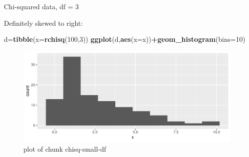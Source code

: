 \documentclass[
  ignorenonframetext,
]{beamer}
\newenvironment{Shaded}{\begin{snugshade}}{\end{snugshade}}
\newcommand{\DataTypeTok}[1]{\textcolor[rgb]{0.13,0.29,0.53}{#1}}
\newcommand{\DecValTok}[1]{\textcolor[rgb]{0.00,0.00,0.81}{#1}}
\newcommand{\KeywordTok}[1]{\textcolor[rgb]{0.13,0.29,0.53}{\textbf{#1}}}
\newcommand{\NormalTok}[1]{#1}
\newcommand{\OperatorTok}[1]{\textcolor[rgb]{0.81,0.36,0.00}{\textbf{#1}}}
\begin{document}
\begin{frame}[fragile]{Chi-squared data, df = 3}
\protect\hypertarget{chi-squared-data-df-3}{}

Definitely skewed to right:

\begin{Shaded}
\begin{Highlighting}[]
\NormalTok{d=}\KeywordTok{tibble}\NormalTok{(}\DataTypeTok{x=}\KeywordTok{rchisq}\NormalTok{(}\DecValTok{100}\NormalTok{,}\DecValTok{3}\NormalTok{))}
\KeywordTok{ggplot}\NormalTok{(d,}\KeywordTok{aes}\NormalTok{(}\DataTypeTok{x=}\NormalTok{x))}\OperatorTok{+}\KeywordTok{geom_histogram}\NormalTok{(}\DataTypeTok{bins=}\DecValTok{10}\NormalTok{)}
\end{Highlighting}
\end{Shaded}

\begin{figure}
\centering
\includegraphics{figure/chisq-small-df-1.pdf}
\caption{plot of chunk chisq-small-df}
\end{figure}

\end{frame}
\end{document}
